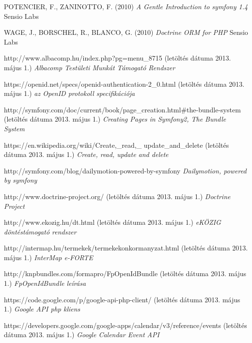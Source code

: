 \documentclass[a4paper,12pt,oneside]{report}
\begin{document}
\begin{thebibliography}{99}
        {POTENCIER}, F., {ZANINOTTO}, F. (2010)
        {\em A Gentle Introduction to symfony 1.4}
        Sensio Labs

        WAGE, J., BORSCHEL, R., BLANCO, G. (2010)
        {\em Doctrine ORM for PHP}
        Sensio Labs

        http://www.albacomp.hu/index.php?pg=menu\_8715
        (letöltés dátuma 2013. május 1.)
        {\em Albacomp Testületi Munkát Támogató Rendszer}

        https://openid.net/specs/openid-authentication-2\_0.html
        (letöltés dátuma 2013. május 1.)
        {\em az OpenID protokoll specifikációja}

        http://symfony.com/doc/current/book/page\_creation.html\#the-bundle-system
        (letöltés dátuma 2013. május 1.)
        {\em Creating Pages in Symfony2, The Bundle System}

        https://en.wikipedia.org/wiki/Create,\_read,\_ update\_and\_delete
        (letöltés dátuma 2013. május 1.)
        {\em Create, read, update and delete}

        http://symfony.com/blog/dailymotion-powered-by-symfony
        {\em Dailymotion, powered by symfony}

        http://www.doctrine-project.org/
        (letöltés dátuma 2013. május 1.)
        {\em Doctrine Project}

        http://www.ekozig.hu/dt.html
        (letöltés dátuma 2013. május 1.)
        {\em eKÖZIG döntéstámogató rendszer}

        http://intermap.hu/termekek/termekekonkormanyzat.html
        (letöltés dátuma 2013. május 1.)
        {\em InterMap e-FORTE}

        http://knpbundles.com/formapro/FpOpenIdBundle
        (letöltés dátuma 2013. május 1.)
        {\em FpOpenIdBundle leírása}

        https://code.google.com/p/google-api-php-client/
        (letöltés dátuma 2013. május 1.)
        {\em Google API php kliens}

        https://developers.google.com/google-apps/calendar/v3/reference/events
        (letöltés dátuma 2013. május 1.)
        {\em Google Calendar Event API}


\end{thebibliography}
\end{document}
